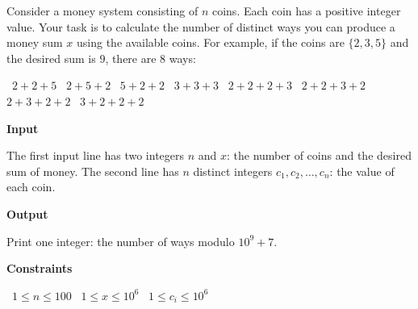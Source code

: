 Consider a money system consisting of $n$ coins. Each coin has a positive integer value. Your task is to calculate the number of distinct ways you can produce a money sum $x$ using the available coins.
For example, if the coins are $\{2,3,5\}$ and the desired sum is $9$, there are $8$ ways:

\textbullet\ $2+2+5$
\textbullet\ $2+5+2$
\textbullet\ $5+2+2$
\textbullet\ $3+3+3$
\textbullet\ $2+2+2+3$
\textbullet\ $2+2+3+2$
\textbullet\ $2+3+2+2$
\textbullet\ $3+2+2+2$

\vspace{0.3cm}\noindent\textbf{Input}

The first input line has two integers $n$ and $x$: the number of coins and the desired sum of money.
The second line has $n$ distinct integers $c_1,c_2,\dots,c_n$: the value of each coin.

\vspace{0.3cm}\noindent\textbf{Output}

Print one integer: the number of ways modulo $10^9+7$.

\vspace{0.3cm}\noindent\textbf{Constraints}

\textbullet\ $1 \le n \le 100$
\textbullet\ $1 \le x \le 10^6$
\textbullet\ $1 \le c_i \le 10^6$